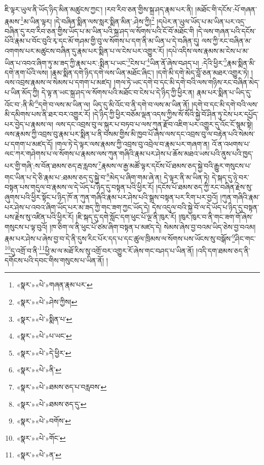 ཇི་ལྟར་ཡུལ་ནི་ཡོད་ཉིད་མིན་མཚུངས་ཀྱང་། །རབ་རིབ་ཅན་གྱིས་སྐྲ་ཤད་རྣམ་པར་ནི། །མཐོང་གི་དངོས་:པོ་གཞན་རྣམས་\footnote{«སྣར་»«པེ་»གཞན་རྣམ་པར་}མ་ཡིན་ལྟར། །དེ་བཞིན་སྨིན་ལས་སླར་སྨིན་མིན་:ཤེས་ཀྱི།\footnote{«སྣར་»«པེ་»ཤེས་ཀྱིས།} །དཔེར་ན་ཡུལ་ཡོད་པ་མ་ཡིན་པར་འདྲ་བཞིན་དུ་རབ་རིབ་ཅན་གྱིས་ཡོད་པ་མ་ཡིན་པའི་སྐྲ་ཤད་ལ་སོགས་པའི་ངོ་བོ་མཐོང་གི །དེ་ལས་གཞན་པའི་དངོས་པོའི་རྣམ་པ་བོང་བུའི་རྭ་དང་མོ་གཤམ་གྱི་བུ་ལ་སོགས་པ་དག་ནི་མ་ཡིན་པ་དེ་བཞིན་དུ། ལས་ཀྱི་རང་བཞིན་མ་འགགས་པར་མཚུངས་བཞིན་དུ་རྣམ་པར་སྨིན་པ་ལ་ངེས་པར་འགྱུར་རོ། །དཔེ་འདིས་ལས་རྣམས་མ་ངེས་པ་མ་ཡིན་པ་འབའ་ཞིག་ཏུ་མ་ཟད་ཀྱི་རྣམ་པར་:སྨིན་པ་ཡང་\footnote{«སྣར་»«པེ་»སྨིན་པ་}ངེས་པ་\footnote{«སྣར་»«པེ་»པ་ཡང་}ཡིན་ནོ་ཞེས་བཤད་པ། :དེའི་ཕྱིར་\footnote{«སྣར་»«པེ་»དེ་ཕྱིར་}རྣམ་སྨིན་མི་དགེ་ནག་པོའི་ལས། །རྣམ་སྨིན་དགེ་ཉིད་དགེ་ལས་ཡིན་མཐོང་ཞིང་། །དགེ་མི་དགེ་མེད་བློ་ཅན་མཐར་འགྱུར་ཏེ། །ལས་འབྲས་རྣམས་ལ་སེམས་པ་དགག་པ་མཛད། །གལ་ཏེ་ཡང་དགེ་བ་དང་མི་དགེ་བའི་ལས་གཉིས་རང་བཞིན་མེད་པ་ཡིན་མོད་ཀྱི། དེ་ལྟ་ན་ཡང་སྐྲ་ཤད་ལ་སོགས་པའི་མཐོང་བ་ངེས་པ་དེ་ཉིད་ཀྱི་ཕྱིར་ན། རྣམ་པར་སྨིན་པ་ཡིད་དུ་འོང་བ་:ནི་མི་\footnote{«སྣར་»«པེ་»ནི་}དགེ་བ་ལས་མ་ཡིན་ལ། ཡིད་དུ་མི་འོང་བ་ནི་དགེ་བ་ལས་མ་ཡིན་ནོ། །དགེ་བ་དང་མི་དགེ་བའི་ལས་མི་དམིགས་པས་ནི་ཐར་བར་འགྱུར་རོ། །དེ་ཉིད་ཀྱི་ཕྱིར་བཅོམ་ལྡན་འདས་ཀྱིས་སོ་སོའི་སྐྱེ་བོ་ཤིན་ཏུ་ངེས་པར་དཔྱོད་པར་བྱེད་པ་རྣམས་ལ། ལས་དང་འབྲས་བུ་ལ་སྐུར་པ་བཏབ་པ་ལས་ཀུན་རྫོབ་འཇིག་པར་འགྱུར་དུ་འོང་ངོ་སྙམ་སྟེ། ལས་རྣམས་ཀྱི་འབྲས་བུ་རྣམ་པར་སྨིན་པ་ནི་བསམ་གྱིས་མི་ཁྱབ་པོ་ཞེས་ལས་དང་འབྲས་བུ་ལ་བརྟེན་པའི་སེམས་པ་དགག་པ་མཛད་དོ། །གལ་ཏེ་དེ་ལྟར་ལས་རྣམས་ཀྱི་འབྲས་བུ་འབྲེལ་བ་རྣམ་པར་གཞག་ན། འོ་ན་འཕགས་པ་ལང་ཀར་གཤེགས་པ་ལ་སོགས་པ་རྣམས་ལས་ཀུན་གཞིའི་རྣམ་པར་ཤེས་པ་ཆོས་མཐའ་ཡས་པའི་ནུས་པའི་ཁྱད་པར་གྱི་གཞི་:ས་བོན་ཐམས་ཅད་རྦ་རླབས་\footnote{«སྣར་»«པེ་»ཐམས་ཅད་པ་བརླབས་}རྣམས་ལ་རྒྱ་མཚོ་ལྟར་དངོས་པོ་ཐམས་ཅད་སྐྱེ་བའི་རྒྱུར་གསུངས་པ་གང་ཡིན་པ་དེ་ཅི་རྣམ་པ་:ཐམས་ཅད་དུ་སྐྱེ་བ་\footnote{«སྣར་»«པེ་»ཐམས་ཅད་དུ་}མེད་པ་ཞིག་གམ་ཞེ་ན། དེ་ལྟར་ནི་མ་ཡིན་ཏེ། དེ་སྐད་དུ་ཉེ་བར་བསྟན་པས་གདུལ་བ་རྣམས་ལ་དེ་ཡོད་པ་ཉིད་དུ་བསྟན་པའི་ཕྱིར་རོ། །དངོས་པོ་ཐམས་ཅད་ཀྱི་རང་བཞིན་རྗེས་སུ་ཞུགས་པའི་ཕྱིར་སྟོང་པ་ཉིད་ཁོ་ན་ཀུན་གཞིའི་རྣམ་པར་ཤེས་པའི་སྒྲས་བསྟན་པར་རིག་པར་བྱའོ། །ཀུན་གཞིའི་རྣམ་པར་ཤེས་པ་འབའ་ཞིག་ཡོད་པར་མ་ཟད་ཀྱི་གང་ཟག་ཀྱང་ཡོད་དེ། དེས་འདུལ་བའི་སྐྱེ་བོ་ལ་དེ་ཡོད་པ་ཉིད་དུ་བསྟན་པས་རྗེས་སུ་འཛིན་པའི་ཕྱིར་རོ། །ཇི་སྐད་དུ་དགེ་སློང་དག་ཕུང་པོ་ལྔ་ནི་ཁུར་རོ། །ཁུར་ཁུར་བ་ནི་གང་ཟག་གོ་ཞེས་གསུངས་པ་ལྟ་བུའོ། །ཁ་ཅིག་ལ་ནི་ཕུང་པོ་ཙམ་ཞིག་བསྟན་པ་མཛད་དེ། སེམས་ཞེས་བྱ་བའམ་ཡིད་ཅེས་བྱ་བའམ། རྣམ་པར་ཤེས་པ་ཞེས་བྱ་བ་དེ་ནི་དུས་རིང་པོར་དད་པ་དང་ཚུལ་ཁྲིམས་ལ་སོགས་པས་ཡོངས་སུ་བསྒོས་\footnote{«སྣར་»«པེ་»བགོས་}ཤིང་གང་\footnote{«སྣར་»«པེ་»གོང་}དུ་འགྲོ་བ་ནི་\footnote{«སྣར་»«པེ་»ན་}ཕྱི་མ་ལ་མཐོ་རིས་སུ་འགྲོ་བར་འགྱུར་རོ་ཞེས་གང་བཤད་པ་ཡིན་ནོ། །འདི་དག་ཐམས་ཅད་ནི་དགོངས་པའི་དབང་གིས་གསུངས་པ་ཡིན་ནོ། །
